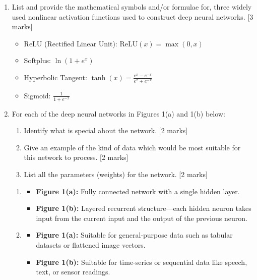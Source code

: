 \begin{enumerate}
    \item[(a)] List and provide the mathematical symbols and/or formulae for, three widely used nonlinear activation functions used to construct deep neural networks. [3 marks]
    {\color{blue}
        \begin{itemize}
            \item ReLU (Rectified Linear Unit): $\mathrm{ReLU}(x) = \max(0, x)$
            \item Softplus: $\ln{(1 + e^{x})}$
            \item Hyperbolic Tangent: $\tanh(x) = \frac{e^x - e^{-x}}{e^x + e^{-x}}$
            \item Sigmoid: $\frac{1}{1 + e^{-x}}$
        \end{itemize}
    }
    \item[(b)] For each of the deep neural networks in Figures 1(a) and 1(b) below:
    \begin{enumerate}
        \item[(i)] Identify what is special about the network. [2 marks]
        \item[(ii)] Give an example of the kind of data which would be most suitable for this network to process. [2 marks]
        \item[(iii)] List all the parameters (weights) for the network. [2 marks]
    \end{enumerate}
    {\color{blue}
        \begin{enumerate}
            \item[(i)] 
            \begin{itemize}
                \item \textbf{Figure 1(a):} Fully connected network with a single hidden layer.
                \item \textbf{Figure 1(b):} Layered recurrent structure—each hidden neuron takes input from the current input and the output of the previous neuron.
            \end{itemize}
            
            \item[(ii)] 
            \begin{itemize}
                \item \textbf{Figure 1(a):} Suitable for general-purpose data such as tabular datasets or flattened image vectors.
                \item \textbf{Figure 1(b):} Suitable for time-series or sequential data like speech, text, or sensor readings.
            \end{itemize}


\end{enumerate}}
\end{enumerate}
